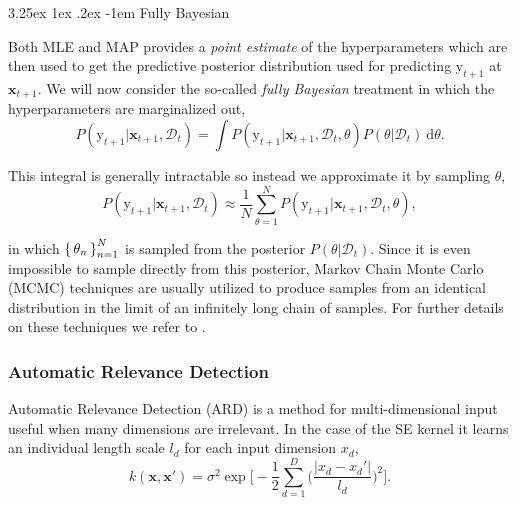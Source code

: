 \documentclass[conference,compsoc]{IEEEtran}
\makeatletter
\def\paragraph{\@startsection{paragraph}{4}{\z@}%
                                    {3.25ex \@plus1ex \@minus.2ex}%
                                    {-1em}%
                                    {\normalfont\normalsize\bfseries}}
\theoremstyle{definition}
\makeatother
\begin{document}
            \paragraph{Fully Bayesian}\label{sec:hypmcmc}

                Both MLE and MAP provides a \emph{point estimate} of the hyperparameters which are then used to get the predictive posterior distribution used for predicting $\mathrm{y}_{t+1}$ at $\bm{x}_{t+1}$.
                We will now consider the so-called \emph{fully Bayesian} treatment in which the hyperparameters are marginalized out,
                    \begin{equation} 
                        P(\mathrm{y}_{t+1}|\bm{x}_{t+1},\mathcal{D}_t) = \int P(\mathrm{y}_{t+1}|\bm{x}_{t+1},\mathcal{D}_t,\theta) P(\theta|\mathcal{D}_t)\ \mathrm{d}\theta.
                    \end{equation}

                This integral is generally intractable so instead we approximate it by sampling $\theta$,
                \begin{equation} 
                    P(\mathrm{y}_{t+1}|\bm{x}_{t+1},\mathcal{D}_t) \approx \frac{1}{N} \sum_{\theta=1}^{N} P(\mathrm{y}_{t+1}|\bm{x}_{t+1},\mathcal{D}_t,\theta),
                \end{equation}

                \noindent in which $\set{\theta_n}_{n=1}^N$ is sampled from the posterior $P(\theta|\mathcal{D}_t)$. 
                Since it is even impossible to sample directly from this posterior, Markov Chain Monte Carlo (MCMC) techniques are usually utilized to produce samples from an identical distribution in the limit of an infinitely long chain of samples. %
                For further details on these techniques we refer to \parencite{berg_introduction_2004}.

   
        \subsubsection{Automatic Relevance Detection}\label{sec:ard}
          
            Automatic Relevance Detection (ARD) is a method for multi-dimensional input useful when many dimensions are irrelevant.
            In the case of the SE kernel it learns an individual length scale $l_d$ for each input dimension $x_d$,
            \begin{equation}
                k(\bm{x},\bm{x}') = \sigma^2 \exp \bigg[ -\frac{1}{2} \sum_{d=1}^{D} \Big(\frac{|x_d - x_d'|}{l_d}\Big)^2 \bigg].
            \end{equation}
        
\end{document}
